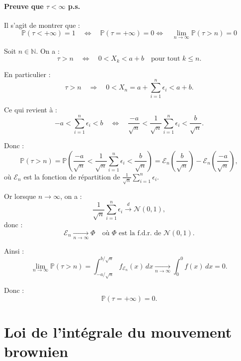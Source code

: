 

\paragraph{Preuve que  $\tau < \infty$ p.s.}

Il s'agit de montrer que :
\[
\mathbb{P}(\tau <  +\infty) = 1 \quad \Longleftrightarrow \quad \mathbb{P}(\tau = +\infty) = 0  \Longleftrightarrow \quad \lim_{n \to \infty} \mathbb{P}(\tau > n) = 0 
\]

Soit \( n \in \mathbb{N} \). On a :
\[
\tau > n \quad \Longleftrightarrow \quad 0 < X_k < a + b \quad \text{pour tout } k \leq n.
\]

En particulier :
\[
\tau > n \quad \Longrightarrow \quad 0 < X_n = a + \sum_{i=1}^n \epsilon_i < a + b.
\]

Ce qui revient à :
\[
-a < \sum_{i=1}^n \epsilon_i < b \quad \Longleftrightarrow \quad \frac{-a}{\sqrt{n}} < \frac{1}{\sqrt{n}} \sum_{i=1}^n \epsilon_i < \frac{b}{\sqrt{n}}.
\]

Donc :
\[
\mathbb{P}(\tau > n) = \mathbb{P}\left( \frac{-a}{\sqrt{n}} < \frac{1}{\sqrt{n}} \sum_{i=1}^n \epsilon_i < \frac{b}{\sqrt{n}} \right) =  \mathcal{E}_n\left( \frac{b}{\sqrt{n}} \right) - \mathcal{E}_n\left( \frac{-a}{\sqrt{n}} \right),
\]
où \( \mathcal{E}_n \) est la fonction de répartition de \( \frac{1}{\sqrt{n}} \sum_{i=1}^n \epsilon_i \).

Or lorsque \( n \to \infty \), on a :
\[
\frac{1}{\sqrt{n}} \sum_{i=1}^n \epsilon_i \xrightarrow{d} \mathcal{N}(0,1),
\]
donc :
\[
\mathcal{E}_n \xrightarrow[n \to \infty]{} \Phi \quad \text{où } \Phi \text{ est la f.d.r. de } \mathcal{N}(0,1).
\]

Ainsi :
\[
\lim_{n \to \infty} \mathbb{P}(\tau > n) = \int_{-a/\sqrt{n}}^{b/\sqrt{n}} f_{\mathcal{E}_n}(x) \, dx \xrightarrow[n \to \infty]{} \int_{0}^{0} f(x) \, dx = 0.
\]

Donc :
\[
\boxed{\mathbb{P}(\tau = +\infty) = 0}.
\]


\section{Loi de l'intégrale du mouvement brownien}

